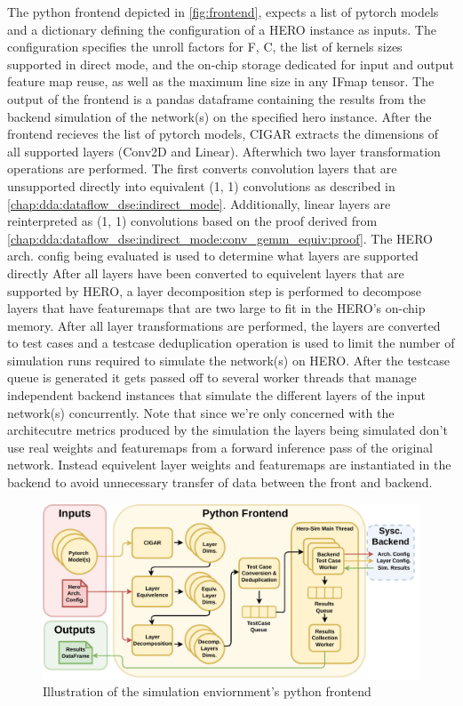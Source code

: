 The python frontend depicted in \autoref{fig:frontend}, expects a list of pytorch models and a dictionary defining the
configuration of a HERO instance as inputs. The configuration specifies the unroll factors
for F, C, the list of kernels sizes supported in direct mode, and the on-chip
storage dedicated for input and output feature map reuse, as well as the maximum
line size in any IFmap tensor.  The output of the
frontend is a pandas dataframe containing the results from the backend
simulation of the network(s) on the specified hero instance.  
After the frontend
recieves the list of pytorch models, CIGAR extracts the dimensions of all
supported layers (Conv2D and Linear). Afterwhich two layer transformation
operations are performed. The first converts convolution layers that are
unsupported directly into equivalent (1, 1) convolutions as described in
\autoref{chap:dda:dataflow_dse:indirect_mode}. Additionally, linear layers are
reinterpreted as (1, 1) convolutions based on the proof derived from
\autoref{chap:dda:dataflow_dse:indirect_mode:conv_gemm_equiv:proof}. 
The HERO arch. config being
evaluated is used to determine what layers are supported directly
After all layers have been converted to equivelent layers
that are supported by HERO, a layer decomposition step is performed to
decompose layers that have featuremaps that are two large to fit in the
HERO's on-chip memory. 
After all layer transformations are
performed, the layers are converted to test cases and a testcase deduplication
operation is used to limit the number of simulation runs required to simulate the network(s)
on HERO. 
After the testcase queue is generated it gets passed off to several
worker threads that manage independent backend instances that simulate the different
layers of the input network(s) concurrently. Note that since we're only
concerned with the architecutre metrics produced by the simulation the layers being
simulated don't use real weights and featuremaps from a forward inference pass
of the original network. Instead equivelent layer weights and featuremaps are
instantiated in the backend to avoid unnecessary transfer of data between the
front and backend.      


\begin{figure}[ht]
    \centering
    \includegraphics[scale=0.58]{fig/hero-sim-frontend.pdf}
    \caption{Illustration of the simulation enviornment's python frontend}
    \label{fig:frontend}
\end{figure}



